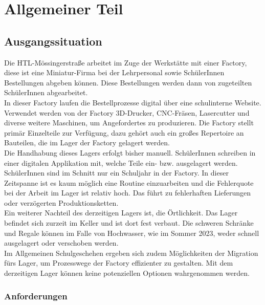\section{Allgemeiner Teil}

\subsection{Ausgangssituation}
Die HTL-Mössingerstraße arbeitet im Zuge der Werkstätte mit einer Factory, diese ist eine Miniatur-Firma bei der Lehrpersonal sowie SchülerInnen Bestellungen abgeben können. Diese Bestellungen werden dann von zugeteilten SchülerInnen abgearbeitet.\\
In dieser Factory laufen die Bestellprozesse digital über eine schulinterne Website. Verwendet werden von der Factory 3D-Drucker, CNC-Fräsen, Lasercutter und diverse weitere Maschinen, um Angefordertes zu produzieren. Die Factory stellt primär Einzelteile zur Verfügung, dazu gehört auch ein großes Repertoire an Bauteilen, die im Lager der Factory gelagert werden.\\ 
Die Handhabung dieses Lagers erfolgt bisher manuell. SchülerInnen schreiben in einer digitalen Applikation mit, welche Teile ein- bzw. ausgelagert werden. SchülerInnen sind im Schnitt nur ein Schuljahr in der Factory. In dieser Zeitspanne ist es kaum möglich eine Routine einzuarbeiten und die Fehlerquote bei der Arbeit im Lager ist relativ hoch. Das führt zu fehlerhaften Lieferungen oder verzögerten Produktionsketten.\\
Ein weiterer Nachteil des derzeitigen Lagers ist, die Örtlichkeit. Das Lager befindet sich zurzeit im Keller und ist dort fest verbaut. Die schweren Schränke und Regale können im Falle von Hochwasser, wie im Sommer 2023, weder schnell ausgelagert oder verschoben werden.\\ 
Im Allgemeinen Schulgeschehen ergeben sich zudem Möglichkeiten der Migration fürs Lager, um Prozesswege der Factory effizienter zu gestalten. Mit dem derzeitigen Lager können keine potenziellen Optionen wahrgenommen werden. 

\subsubsection{Anforderungen}

